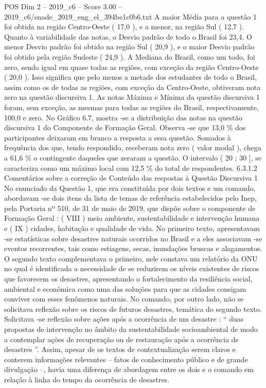 \begin{textsample}{POS Dim 2 – 2019\_c6 – Score 3.00 – 2019\_c6/enade\_2019\_eng\_el\_394be1c0b6.txt}
A maior Média para a questão 1 foi obtida na região Centro-Oeste ( 17,0 ), e a menor, na região Sul ( 12,7 ).
Quanto à variabilidade das notas, o Desvio padrão de todo o Brasil foi 23,4.
O menor Desvio padrão foi obtido na região Sul ( 20,9 ), e o maior Desvio padrão foi obtido pela região Sudeste ( 24,9 ).
A Mediana do Brasil, como um todo, foi zero, sendo igual em quase todas as regiões, com exceção da região Centro-Oeste ( 20,0 ).
Isso significa que pelo menos a metade dos estudantes de todo o Brasil, assim como os de todas as regiões, com exceção da Centro-Oeste, obtiveram nota zero na questão discursiva 1.
As notas Máxima e Mínima da questão discursiva 1 foram, sem exceção, as mesmas para todas as regiões do Brasil, respectivamente, 100,0 e zero.
No Gráfico 6.7, mostra -se a distribuição das notas na questão discursiva 1 do Componente de Formação Geral.
Observa -se que 13,0 \% dos participantes deixaram em branco a resposta a essa questão.
Somados à frequência dos que, tendo respondido, receberam nota zero ( valor modal ), chega a 61,6 \% o contingente daqueles que zeraram a questão.
O intervalo ( 20 ; 30 ], se caracteriza como um máximo local com 12,5 \% do total de respondentes. 6.3.1.2 Comentários sobre a correção de Conteúdo das respostas à Questão Discursiva 1 No enunciado da Questão 1, que era constituída por dois textos e um comando, abordavam -se dois itens da lista de temas de referência estabelecidos pelo Inep, pela Portaria nº 510, de 31 de maio de 2019, que dispõe sobre o componente de Formação Geral : ( VIII ) meio ambiente, sustentabilidade e intervenção humana e ( IX ) cidades, habitação e qualidade de vida.
No primeiro texto, apresentavam -se estatísticas sobre desastres naturais ocorridos no Brasil e a eles associavam -se eventos recorrentes, tais como estiagens, secas, inundações bruscas e alagamentos.
O segundo texto complementava o primeiro, nele constava um relatório da ONU no qual é identificada a necessidade de se reduzirem os níveis existentes de riscos que favorecem os desastres, apresentando o fortalecimento da resiliência social, ambiental e econômica como uma das soluções para que as cidades consigam conviver com esses fenômenos naturais.
No comando, por outro lado, não se solicitava reflexão sobre os riscos de futuros desastres, temática do segundo texto.
Solicitava -se reflexão sobre ações após a ocorrência de um desastre : “ duas propostas de intervenção no âmbito da sustentabilidade socioambiental de modo a contemplar ações de recuperação ou de restauração após a ocorrência de desastres ”.
Assim, apesar de os textos de contextualização serem claros e conterem informações relevantes – fatos de conhecimento público e de grande divulgação –, havia uma diferença de abordagem entre os dois e o comando em relação à linha do tempo da ocorrência de desastres.

\end{textsample}
